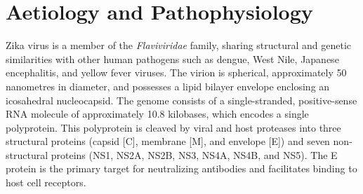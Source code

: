 \section*{Aetiology and Pathophysiology}
Zika virus is a member of the \textit{Flaviviridae} family, sharing structural and genetic similarities with other human pathogens such as dengue, West Nile, Japanese encephalitis, and yellow fever viruses. The virion is spherical, approximately 50 nanometres in diameter, and possesses a lipid bilayer envelope enclosing an icosahedral nucleocapsid. The genome consists of a single-stranded, positive-sense RNA molecule of approximately 10.8 kilobases, which encodes a single polyprotein. This polyprotein is cleaved by viral and host proteases into three structural proteins (capsid [C], membrane [M], and envelope [E]) and seven non-structural proteins (NS1, NS2A, NS2B, NS3, NS4A, NS4B, and NS5). The E protein is the primary target for neutralizing antibodies and facilitates binding to host cell receptors.

